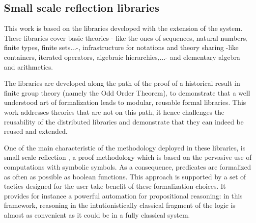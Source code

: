 \documentclass{mscs}
\begin{document}

\subsection{Small scale reflection libraries}
This work is based on the \ssr{} libraries \cite{ssrsite}
developed with the \ssr{} extension
\cite{GONTHIER:2008:INRIA-00258384:4} of the \Coq{} system.
These libraries cover basic theories - like the ones of sequences, natural
numbers, finite types, finite sets...-, infrastructure for notations and
theory sharing -like containers, iterated operators, algebraic
hierarchies,...- and elementary algebra and arithmetics. 

The \ssr{} libraries are developed along the path of the proof of a
historical result in finite group theory (namely the Odd Order
Theorem), to demonstrate that a well
understood art of formalization leads to modular, reusable formal
libraries. This work addresses theories that
are not on this path, it hence challenges the reusability of the
distributed libraries and demonstrate that they can indeed be reused
and extended.

One of the main characteristic of the methodology deployed in these
libraries, is small scale reflection 
\cite{ssr-tutorial}, a proof methodology which is based on the
pervasive use of computations with symbolic symbols. 
As a consequence, predicates are formalized as often as possible as
boolean functions. This approach is supported by a set of tactics
designed for the user take benefit of these formalization
choices. It provides for instance a powerful automation for propositional
reasoning: in this framework, reasoning in the intutionistically
classical fragment of the \Coq{} logic is almost as convenient as it
could be in a fully classical system.
\end{document}
